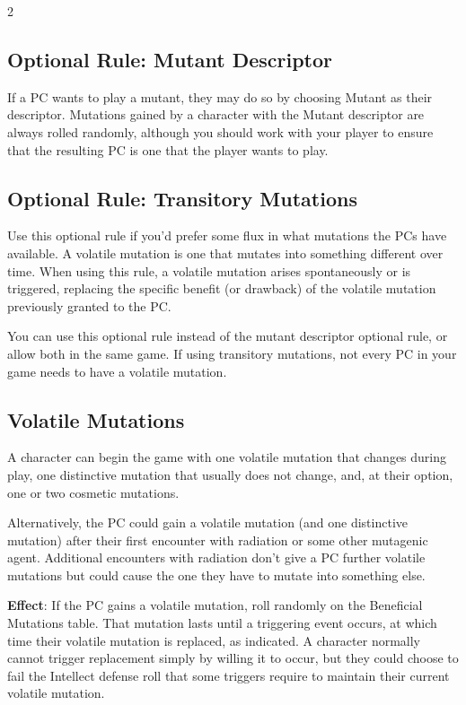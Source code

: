 \begin{multicols}{2}
\subsection{Optional Rule: Mutant Descriptor}

If a PC wants to play a mutant, they may do so by choosing Mutant as their descriptor. Mutations gained by a character with the Mutant descriptor are always rolled randomly, although you should work with your player to ensure that the resulting PC is one that the player wants to play.

\subsection{Optional Rule: Transitory Mutations}

Use this optional rule if you’d prefer some flux in what mutations the PCs have available. A volatile mutation is one that mutates into something different over time. When using this rule, a volatile mutation arises spontaneously or is triggered, replacing the specific benefit (or drawback) of the volatile mutation previously granted to the PC.

You can use this optional rule instead of the mutant descriptor optional rule, or allow both in the same game. If using transitory mutations, not every PC in your game needs to have a volatile mutation.

\subsection{Volatile Mutations}

A character can begin the game with one volatile mutation that changes during play, one distinctive mutation that usually does not change, and, at their option, one or two cosmetic mutations. 

Alternatively, the PC could gain a volatile mutation (and one distinctive mutation) after their first encounter with radiation or some other mutagenic agent. Additional encounters with radiation don’t give a PC further volatile mutations but could cause the one they have to mutate into something else. 

\textbf{Effect}: If the PC gains a volatile mutation, roll randomly on the Beneficial Mutations table. That mutation lasts until a triggering event occurs, at which time their volatile mutation is replaced, as indicated. A character normally cannot trigger replacement simply by willing it to occur, but they could choose to fail the Intellect defense roll that some triggers require to maintain their current volatile mutation.


\end{multicols}
